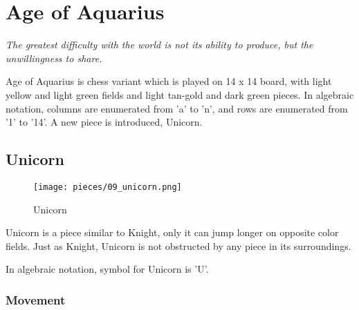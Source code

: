 

\chapter*{Age of Aquarius}

\begin{flushright}
\parbox{0.8\textwidth}{
\emph{The greatest difficulty with the world is not its ability to produce, but the unwillingness to share. \\
 } }
\end{flushright}

\noindent
Age of Aquarius is chess variant which is played on 14 x 14 board,
with light yellow and light green fields and light tan-gold and
dark green pieces. In algebraic notation, columns are enumerated
from 'a' to 'n', and rows are enumerated from '1' to '14'. A new
piece is introduced, Unicorn.

\clearpage %

\section*{Unicorn}

\noindent
\begin{wrapfigure}[7]{l}{0.4\textwidth}
\centering
\texttt{[image: pieces/09\_unicorn.png]}
\caption{Unicorn}
\label{fig:09_unicorn}
\end{wrapfigure}
Unicorn is a piece similar to Knight, only it can jump longer on
opposite color fields. Just as Knight, Unicorn is not obstructed
by any piece in its surroundings.

In algebraic notation, symbol for Unicorn is 'U'.

\vspace{4\baselineskip}
\subsection*{Movement}
\label{sec:Age of Aquarius/Unicorn/Movement}

